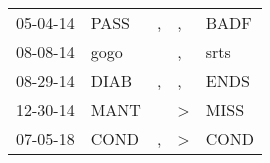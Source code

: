 \begin{supertabular}{p{0.07\textwidth}p{0.06\textwidth}p{0.02\textwidth}p{0.02\textwidth}p{0.06\textwidth}}
 05-04-14\textsuperscript{} &  PASS\textsuperscript{} &  , &             , &  BADF\textsuperscript{} \\
 08-08-14\textsuperscript{} &  gogo\textsuperscript{} &    &             , &  srts\textsuperscript{} \\
 08-29-14\textsuperscript{} &  DIAB\textsuperscript{} &  , &             , &  ENDS\textsuperscript{} \\
 12-30-14\textsuperscript{} &  MANT\textsuperscript{} &    &  \textgreater &  MISS\textsuperscript{} \\
 07-05-18\textsuperscript{} &  COND\textsuperscript{} &  , &  \textgreater &  COND\textsuperscript{} \\
\end{supertabular}
